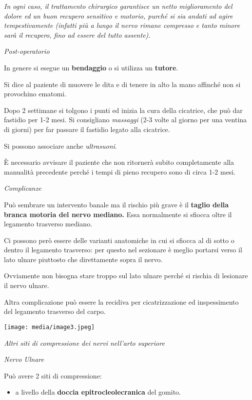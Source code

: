 \documentclass[]{article}
\begin{document}
\emph{In ogni caso, il trattamento chirurgico garantisce un netto
miglioramento del dolore ed un buon recupero sensitivo e motorio, purché
si sia andati ad agire tempestivamente (infatti più a lungo il nervo
rimane compresso e tanto minore sarà il recupero, fino ad essere del
tutto assente).}

\emph{Post-operatorio}

In genere si esegue un \textbf{bendaggio} o si utilizza un
\textbf{tutore}.

Si dice al paziente di muovere le dita e di tenere in alto la mano
affinché non si provochino ematomi.

Dopo 2 settimane si tolgono i punti ed inizia la cura della cicatrice,
che può dar fastidio per 1-2 mesi. Si consigliano \emph{massaggi} (2-3
volte al giorno per una ventina di giorni) per far passare il fastidio
legato alla cicatrice.

Si possono associare anche \emph{ultrasuoni}.

È necessario avvisare il paziente che non ritornerà subito completamente
alla manualità precedente perché i tempi di pieno recupero sono di circa
1-2 mesi.

\emph{Complicanze}

Può sembrare un intervento banale ma il rischio più grave è il
\textbf{taglio della branca motoria del nervo mediano.} Essa normalmente
si sfiocca oltre il legamento trasverso mediano.

Ci possono però essere delle varianti anatomiche in cui si sfiocca al di
sotto o dentro il legamento trasverso: per questo nel sezionare è meglio
portarsi verso il lato ulnare piuttosto che direttamente sopra il nervo.

Ovviamente non bisogna stare troppo sul lato ulnare perché si rischia di
lesionare il nervo ulnare.

Altra complicazione può essere la recidiva per cicatrizzazione ed
inspessimento del legamento trasverso del carpo.

\texttt{[image: media/image3.jpeg]}

\emph{Altri siti di compressione dei nervi nell'arto superiore }

\emph{Nervo Ulnare}

Può avere 2 siti di compressione:

\begin{itemize}
\item
  a livello della \textbf{doccia epitrocleolecranica} del gomito.
\end{itemize}
\end{document}
